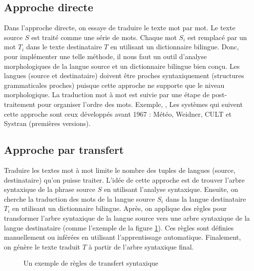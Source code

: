 \documentclass{KodeBook}
\begin{document}
\subsection{Approche directe}

Dans l'approche directe, on essaye de traduire le texte mot par mot. 
Le texte source $S$ est traité comme une série de mots. 
Chaque mot $S_i$ est remplacé par un mot $T_i$ dans le texte destinataire $T$ en utilisant un dictionnaire bilingue. 
Donc, pour implémenter une telle méthode, il nous faut un outil d'analyse morphologiques de la langue source et un dictionnaire bilingue bien conçu. 
Les langues (source et destinataire) doivent être proches syntaxiquement (structures grammaticales proches) puisque cette approche ne supporte que le niveau morphologique. 
La traduction mot à mot est suivie par une étape de post-traitement pour organiser l'ordre des mots. 
Exemple, , 
Les systèmes qui suivent cette approche sont ceux développés avant 1967 : Météo, Weidner, CULT et Systran (premières versions).

\subsection{Approche par transfert}

Traduire les textes mot à mot limite le nombre des tuples de langues (source, destinataire) qu'on puisse traiter. 
L'idée de cette approche est de trouver l'arbre syntaxique de la phrase source $S$ en utilisant l'analyse syntaxique. 
Ensuite, on cherche la traduction des mots de la langue source $S_i$ dans la langue destinataire $T_i$ en utilisant un dictionnaire bilingue.
Après, on applique des règles pour transformer l'arbre syntaxique de la langue source vers une arbre syntaxique de la langue destinataire (comme l'exemple de la figure \ref{fig:mt-transfert-exp}).
Ces règles sont définies manuellement ou inférées en utilisant l'apprentissage automatique.
Finalement, on génère le texte traduit $T$ à partir de l'arbre syntaxique final.

\begin{figure}[!ht]
	\centering
	\caption{Un exemple de règles de transfert syntaxique \cite{06-quah}}
	\label{fig:mt-transfert-exp}
\end{figure}
\end{document}
